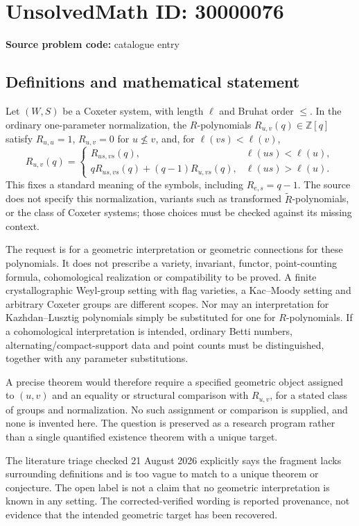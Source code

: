 \documentclass[11pt]{article}
\newcommand{\Z}{\mathbb{Z}}
\begin{document}
\section*{UnsolvedMath ID: 30000076}
\textbf{Source problem code:} catalogue entry
\subsection{Definitions and mathematical statement}
Let $(W,S)$ be a Coxeter system, with length $\ell$ and Bruhat order $\leq$. In the ordinary one-parameter normalization, the $R$-polynomials $R_{u,v}(q)\in\Z[q]$ satisfy $R_{u,u}=1$, $R_{u,v}=0$ for $u\not\leq v$, and, for $\ell(vs)<\ell(v)$,
\[
 R_{u,v}(q)=
 \begin{cases}
 R_{us,vs}(q),&\ell(us)<\ell(u),\\
 qR_{us,vs}(q)+(q-1)R_{u,vs}(q),&\ell(us)>\ell(u).
 \end{cases}
\]
This fixes a standard meaning of the symbols, including $R_{e,s}=q-1$. The source does not specify this normalization, variants such as transformed $\widetilde R$-polynomials, or the class of Coxeter systems; those choices must be checked against its missing context.

The request is for a geometric interpretation or geometric connections for these polynomials. It does not prescribe a variety, invariant, functor, point-counting formula, cohomological realization or compatibility to be proved. A finite crystallographic Weyl-group setting with flag varieties, a Kac--Moody setting and arbitrary Coxeter groups are different scopes. Nor may an interpretation for Kazhdan--Lusztig polynomials simply be substituted for one for $R$-polynomials. If a cohomological interpretation is intended, ordinary Betti numbers, alternating/compact-support data and point counts must be distinguished, together with any parameter substitutions.

A precise theorem would therefore require a specified geometric object assigned to $(u,v)$ and an equality or structural comparison with $R_{u,v}$, for a stated class of groups and normalization. No such assignment or comparison is supplied, and none is invented here. The question is preserved as a research program rather than a single quantified existence theorem with a unique target.

The literature triage checked 21 August 2026 explicitly says the fragment lacks surrounding definitions and is too vague to match to a unique theorem or conjecture. The open label is not a claim that no geometric interpretation is known in any setting. The corrected-verified wording is reported provenance, not evidence that the intended geometric target has been recovered.
\end{document}
